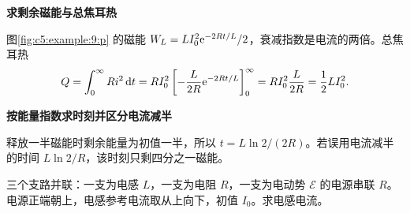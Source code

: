\begin{solution}
{\begin{tikzpicture}
\end{tikzpicture}}



\par\medskip{}\noindent\textbf{求剩余磁能与总焦耳热}\par\nobreak
图\ref{fig:c5:example:9:p} 的磁能 $W_L=LI_0^2\mathrm e^{-2Rt/L}/2$，衰减指数是电流的两倍。总焦耳热
\[
 Q=\int_0^\infty Ri^2\mathop{}\!\mathrm d t
=RI_0^2\left[-\frac L{2R}\mathrm e^{-2Rt/L}\right]_0^\infty
=RI_0^2\frac L{2R}=\frac12LI_0^2.
\]


\par\medskip{}\noindent\textbf{按能量指数求时刻并区分电流减半}\par\nobreak
释放一半磁能时剩余能量为初值一半，所以 $t=L\ln2/(2R)$。若误用电流减半的时间 $L\ln2/R$，该时刻只剩四分之一磁能。\end{solution}
\begin{question}\begin{example}[有源并联网络中的电感响应]\label{c5:example:10}
三个支路并联：一支为电感 $L$，一支为电阻 $R$，一支为电动势 $\mathcal E$ 的电源串联 $R$。电源正端朝上，电感参考电流取从上向下，初值 $I_0$。求电感电流。
\end{example}
\end{question}
